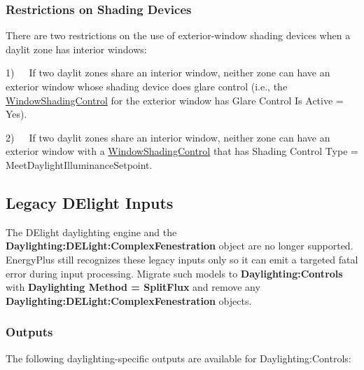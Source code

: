 \subsubsection{Restrictions on Shading Devices}\label{restrictions-on-shading-devices}

There are two restrictions on the use of exterior-window shading devices when a daylit zone has interior windows:

1)~~~If two daylit zones share an interior window, neither zone can have an exterior window whose shading device does glare control (i.e., the \hyperref[windowpropertyshadingcontrol]{WindowShadingControl} for the exterior window has Glare Control Is Active = Yes).

2)~~~If two daylit zones share an interior window, neither zone can have an exterior window with a \hyperref[windowpropertyshadingcontrol]{WindowShadingControl} that has Shading Control Type = MeetDaylightIlluminanceSetpoint.

\subsection{Legacy DElight Inputs}\label{delight-daylighting-method}

The DElight daylighting engine and the \textbf{Daylighting:DELight:ComplexFenestration} object are no longer supported. EnergyPlus still recognizes these legacy inputs only so it can emit a targeted fatal error during input processing. Migrate such models to \textbf{Daylighting:Controls} with \textbf{Daylighting Method = SplitFlux} and remove any \textbf{Daylighting:DELight:ComplexFenestration} objects.

\subsubsection{Outputs}\label{outputs-1-004}

The following daylighting-specific outputs are available for Daylighting:Controls:

